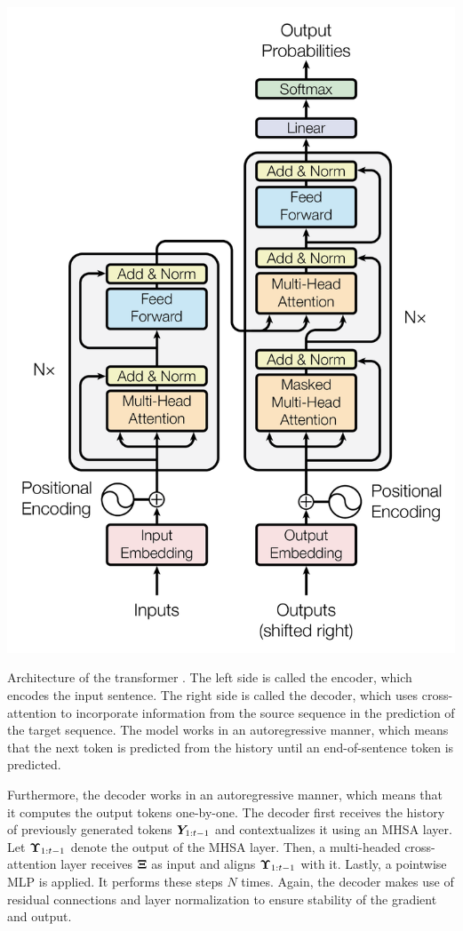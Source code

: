 \begin{marginfigure}
    \includegraphics[width=\textwidth]{figures/transformer-architecture}
    \caption{Architecture of the transformer \citep{vaswani2017attention}. The left side is called the encoder, which encodes the input sentence. The right side is called the decoder, which uses cross-attention to incorporate information from the source sequence in the prediction of the target sequence. The model works in an autoregressive manner, which means that the next token is predicted from the history until an end-of-sentence token is predicted.}
    \label{fig:transformer-arch}
\end{marginfigure}

Furthermore, the decoder works in an autoregressive manner, which means that it computes the output
tokens one-by-one. The decoder first receives the history of previously generated tokens
$\bm{Y}_{1:t-1}$ and contextualizes it using an MHSA layer. Let $\bm{\Upsilon}_{1:t-1}$ denote
the output of the MHSA layer. Then, a multi-headed cross-attention layer receives $\bm{\Xi}$ as
input and aligns $\bm{\Upsilon}_{1:t-1}$ with it. Lastly, a pointwise MLP is applied. It performs
these steps $N$ times. Again, the decoder makes use of residual connections and layer normalization
to ensure stability of the gradient and output.

